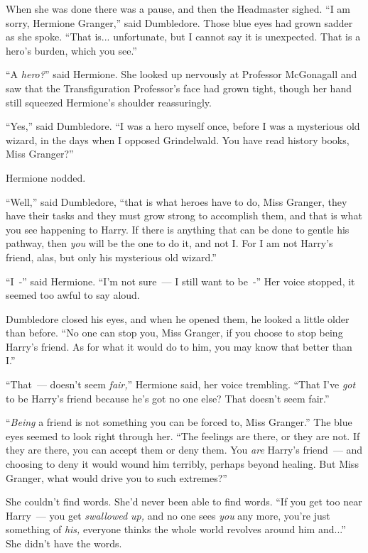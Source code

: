 When she was done there was a pause, and then the Headmaster sighed. ``I am sorry, Hermione Granger,'' said Dumbledore. Those blue eyes had grown sadder as she spoke. ``That is... unfortunate, but I cannot say it is unexpected. That is a hero's burden, which you see.''

``A \emph{hero?}'' said Hermione. She looked up nervously at Professor McGonagall and saw that the Transfiguration Professor's face had grown tight, though her hand still squeezed Hermione's shoulder reassuringly.

``Yes,'' said Dumbledore. ``I was a hero myself once, before I was a mysterious old wizard, in the days when I opposed Grindelwald. You have read history books, Miss Granger?''

Hermione nodded.

``Well,'' said Dumbledore, ``that is what heroes have to do, Miss Granger, they have their tasks and they must grow strong to accomplish them, and that is what you see happening to Harry. If there is anything that can be done to gentle his pathway, then \emph{you} will be the one to do it, and not I. For I am not Harry's friend, alas, but only his mysterious old wizard.''

``I~-'' said Hermione. ``I'm not sure~--- I still want to be~-'' Her voice stopped, it seemed too awful to say aloud.

Dumbledore closed his eyes, and when he opened them, he looked a little older than before. ``No one can stop you, Miss Granger, if you choose to stop being Harry's friend. As for what it would do to him, you may know that better than I.''

``That~--- doesn't seem \emph{fair,}'' Hermione said, her voice trembling. ``That I've \emph{got} to be Harry's friend because he's got no one else? That doesn't seem fair.''

``\emph{Being} a friend is not something you can be forced to, Miss Granger.'' The blue eyes seemed to look right through her. ``The feelings are there, or they are not. If they are there, you can accept them or deny them. You \emph{are} Harry's friend~--- and choosing to deny it would wound him terribly, perhaps beyond healing. But Miss Granger, what would drive you to such extremes?''

She couldn't find words. She'd never been able to find words. ``If you get too near Harry~--- you get \emph{swallowed up,} and no one sees \emph{you} any more, you're just something of \emph{his,} everyone thinks the whole world revolves around him and...'' She didn't have the words.

